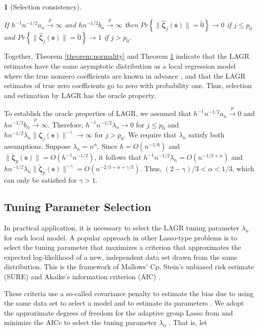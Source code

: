 \documentclass[12pt,english,authoryear, review]{article}\usepackage[]{graphicx}\usepackage[]{color}
\theoremstyle{plain}
\newtheorem{thm}{\protect\theoremname}
\theoremstyle{plain}
\providecommand{\theoremname}{Theorem}
\begin{document}
\begin{thm}[Selection consistency]
\label{theorem:selection}



If $h^{-1}n^{-1/2}a_{n}\xrightarrow{p}\infty$ and $hn^{-1/2}b_{n}\xrightarrow{p}\infty$
then $Pr\left\{ \|\hat{\bm{\zeta}}_{j}\left(\bm{s}\right)\|=\utilde{0}\right\} \to0$
if $j\le p_{0}$ and $Pr\left\{ \|\hat{\bm{\zeta}}_{j}\left(\bm{s}\right)\|=\utilde{0}\right\} \to1$
if $j>p_{0}$. 
\end{thm}
Together, Theorem \ref{theorem:normality} and Theorem \ref{theorem:selection}
indicate that the LAGR estimates have the same asymptotic distribution
as a local regression model where the true nonzero coefficients are
known in advance \citep{Sun-Yan-Zhang-Lu-2014}, and that the LAGR
estimates of true zero coefficients go to zero with probability one.
Thus, selection and estimation by LAGR has the oracle property.

To establish the oracle properties of LAGR, we assumed that $h^{-1}n^{-1/2}a_{n}\xrightarrow{p}0$
and $hn^{-1/2}b_{n}\xrightarrow{p}\infty$. Therefore, $h^{-1}n^{-1/2}\lambda_{n}\to0$
for $j\le p_{0}$ and $hn^{-1/2}\lambda_{n}\|\bm{\zeta}_{j}\left(\bm{s}\right)\|^{-\gamma}\to\infty$
for $j>p_{0}$. We require that $\lambda_{n}$ satisfy both assumptions.
Suppose $\lambda_{n}=n^{\alpha}$. Since $h=O\left(n^{-1/6}\right)$
and $\|\tilde{\bm{\zeta}}_{p}(\bm{s})\|=O\left(h^{-1}n^{-1/2}\right)$,
it follows that $h^{-1}n^{-1/2}\lambda_{n}=O\left(n^{-1/3+\alpha}\right)$
and $hn^{-1/2}\lambda_{n}\|\tilde{\bm{\zeta}}_{p}\left(\bm{s}\right)\|^{-\gamma}=O\left(n^{-2/3+\alpha+\gamma/3}\right)$.
Thus, $\left(2-\gamma\right)/3<\alpha<1/3$, which can only be satisfied
for $\gamma>1$.


\subsection{Tuning Parameter Selection}

In practical application, it is necessary to select the LAGR tuning
parameter $\lambda_{n}$ for each local model. A popular approach
in other Lasso-type problems is to select the tuning parameter that
maximizes a criterion that approximates the expected log-likelihood
of a new, independent data set drawn from the same distribution. This
is the framework of Mallows' Cp, Stein's unbiased risk estimate (SURE)
and Akaike's information criterion (AIC) \citep{Mallows-1973,Stein-1981,Akaike-1973}.

These criteria use a so-called covariance penalty to estimate the
bias due to using the same data set to select a model and to estimate
its parameters \citep{Efron:2004a}. We adopt the approximate degrees
of freedom for the adaptive group Lasso from \citet{Yuan-Lin-2006}
and minimize the AICc to select the tuning parameter $\lambda_{n}$
\citep{Hurvich-1998}. That is, let
\end{document}
